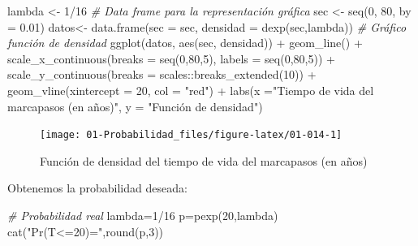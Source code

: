 \documentclass[
]{book}
\newenvironment{Shaded}{\begin{snugshade}}{\end{snugshade}}
\newcommand{\AttributeTok}[1]{\textcolor[rgb]{0.77,0.63,0.00}{#1}}
\newcommand{\CommentTok}[1]{\textcolor[rgb]{0.56,0.35,0.01}{\textit{#1}}}
\newcommand{\DecValTok}[1]{\textcolor[rgb]{0.00,0.00,0.81}{#1}}
\newcommand{\FloatTok}[1]{\textcolor[rgb]{0.00,0.00,0.81}{#1}}
\newcommand{\FunctionTok}[1]{\textcolor[rgb]{0.00,0.00,0.00}{#1}}
\newcommand{\NormalTok}[1]{#1}
\newcommand{\OtherTok}[1]{\textcolor[rgb]{0.56,0.35,0.01}{#1}}
\newcommand{\SpecialCharTok}[1]{\textcolor[rgb]{0.00,0.00,0.00}{#1}}
\newcommand{\StringTok}[1]{\textcolor[rgb]{0.31,0.60,0.02}{#1}}
\theoremstyle{definition}
\theoremstyle{definition}
\theoremstyle{definition}
\theoremstyle{definition}
\theoremstyle{remark}
\begin{document}
\begin{Shaded}
\begin{Highlighting}[]
\NormalTok{lambda }\OtherTok{\textless{}{-}} \DecValTok{1}\SpecialCharTok{/}\DecValTok{16}
\CommentTok{\# Data frame para la representación gráfica}
\NormalTok{sec }\OtherTok{\textless{}{-}} \FunctionTok{seq}\NormalTok{(}\DecValTok{0}\NormalTok{, }\DecValTok{80}\NormalTok{, }\AttributeTok{by =} \FloatTok{0.01}\NormalTok{)}
\NormalTok{datos}\OtherTok{\textless{}{-}} \FunctionTok{data.frame}\NormalTok{(}\AttributeTok{sec =}\NormalTok{ sec, }\AttributeTok{densidad =} \FunctionTok{dexp}\NormalTok{(sec,lambda))}
\CommentTok{\# Gráfico función de densidad}
\FunctionTok{ggplot}\NormalTok{(datos, }\FunctionTok{aes}\NormalTok{(sec, densidad)) }\SpecialCharTok{+} 
  \FunctionTok{geom\_line}\NormalTok{() }\SpecialCharTok{+}
  \FunctionTok{scale\_x\_continuous}\NormalTok{(}\AttributeTok{breaks =} \FunctionTok{seq}\NormalTok{(}\DecValTok{0}\NormalTok{,}\DecValTok{80}\NormalTok{,}\DecValTok{5}\NormalTok{), }\AttributeTok{labels =} \FunctionTok{seq}\NormalTok{(}\DecValTok{0}\NormalTok{,}\DecValTok{80}\NormalTok{,}\DecValTok{5}\NormalTok{)) }\SpecialCharTok{+}
  \FunctionTok{scale\_y\_continuous}\NormalTok{(}\AttributeTok{breaks =}\NormalTok{ scales}\SpecialCharTok{::}\FunctionTok{breaks\_extended}\NormalTok{(}\DecValTok{10}\NormalTok{)) }\SpecialCharTok{+}
  \FunctionTok{geom\_vline}\NormalTok{(}\AttributeTok{xintercept =} \DecValTok{20}\NormalTok{, }\AttributeTok{col =} \StringTok{"red"}\NormalTok{) }\SpecialCharTok{+}
  \FunctionTok{labs}\NormalTok{(}\AttributeTok{x =}\StringTok{"Tiempo de vida del marcapasos (en años)"}\NormalTok{, }
       \AttributeTok{y =} \StringTok{"Función de densidad"}\NormalTok{)}
\end{Highlighting}
\end{Shaded}

\begin{figure}

{\centering \texttt{[image: 01-Probabilidad\_files/figure-latex/01-014-1]} 

}

\caption{Función de densidad del tiempo de vida del marcapasos (en años)}\label{fig:01-014}
\end{figure}

Obtenemos la probabilidad deseada:

\begin{Shaded}
\begin{Highlighting}[]
\CommentTok{\# Probabilidad real}
\NormalTok{lambda}\OtherTok{=}\DecValTok{1}\SpecialCharTok{/}\DecValTok{16}
\NormalTok{p}\OtherTok{=}\FunctionTok{pexp}\NormalTok{(}\DecValTok{20}\NormalTok{,lambda)}
\FunctionTok{cat}\NormalTok{(}\StringTok{"Pr(T\textless{}=20)="}\NormalTok{,}\FunctionTok{round}\NormalTok{(p,}\DecValTok{3}\NormalTok{))}
\end{Highlighting}
\end{Shaded}
\end{document}
